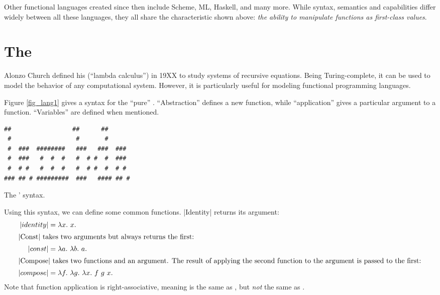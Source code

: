 \documentclass[12pt]{report}
\begin{document}
Other functional languages created since then include 
Scheme, ML, Haskell, and many more. While syntax, semantics and capabilities
differ widely between all these languages, they all share the characteristic
shown above: \emph{the ability to manipulate functions as first-class values}.

\section{The \LamA}


Alonzo Church defined his \lamA (``lambda calculus'') in 19XX
\citep{ChurchXX} to study systems of recursive equations. Being
Turing-complete, it can be used to model the behavior of any
computational system. However, it is particularly useful for modeling
functional programming languages. %

Figure \ref{fig_lang1} gives a syntax for the ``pure''
\lamA. ``Abstraction'' defines a new function, while ``application''
gives a particular argument to a function. ``Variables'' are defined
when mentioned. 

\begin{myfig}[ht]
\begin{minipage}{3in}
\begin{Verbatim}
##                 ##      ##       
 #                  #       #       
 #  ###  ########   ###   ###  ###  
 #  ###   #  #  #   #  # #  #  ###  
 #  # #   #  #  #   #  # #  #  # #  
### ## # #########  ###   #### ## # 
\end{Verbatim}
\end{minipage}
  \caption{The \lamA' syntax.}
  \label{fig_lang1}
\end{myfig}


Using this syntax, we can define some common functions. |Identity|
returns its argument:
\begin{align}
  |identity| &= \lambda x.\ x. \label{eq_lang2} \\
  \intertext{|Const| takes two arguments but always returns the first:}
  |const| &= \lambda a.\ \lambda b.\ a. \label{eq_lang4} \\
  \intertext{|Compose| takes two functions and an argument. The result of
    applying the second function to the argument is passed to the first:}
  |compose| &= \lambda f.\ \lambda g.\ \lambda x.\ f\ g\ x. \label{eq_lang3} 
\end{align}
Note that function application is right-associative, meaning
 is the same as ,
but \emph{not} the same as .
\end{document}
